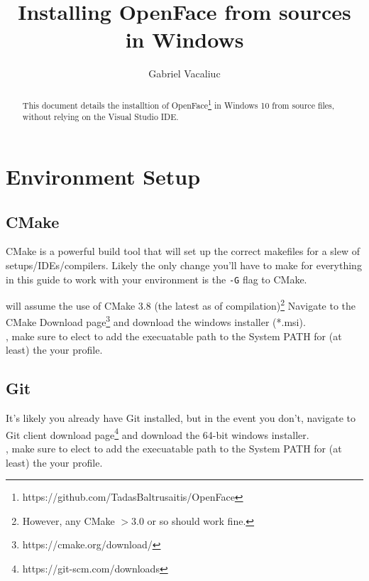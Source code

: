 \documentclass{tufte-handout}
\title{Installing OpenFace from sources in Windows}
\author{Gabriel Vacaliuc}
\begin{document}
\maketitle%

\begin{abstract}
    \noindent This document details the installtion of OpenFace\footnote{
        https://github.com/TadasBaltrusaitis/OpenFace} in Windows 10 from source files, 
    without relying on the Visual Studio IDE.
\end{abstract}

\section{Environment Setup}

\subsection{CMake}

CMake is a powerful build tool that will set up the correct makefiles for a slew of 
setups/IDEs/compilers.  Likely the only change you'll have to make for everything in this guide 
to work with your environment is the \Verb|-G| flag to CMake.

 will assume the use of CMake 3.8 (the latest as
of compilation)\footnote{ However, any CMake $> 3.0$ or so should work fine.}  Navigate to the CMake 
Download page\footnote{https://cmake.org/download/} and download the windows installer (*.msi). \\

, make sure to elect to add the execuatable path to the System PATH
for (at least) the your profile. \\

\subsection{Git}

It's likely you already have Git installed, but in the event you don't, navigate to Git client
download page\footnote{https://git-scm.com/downloads} and download the 64-bit windows installer. \\

, make sure to elect to add the execuatable path to the System PATH
for (at least) the your profile. \\
\end{document}
